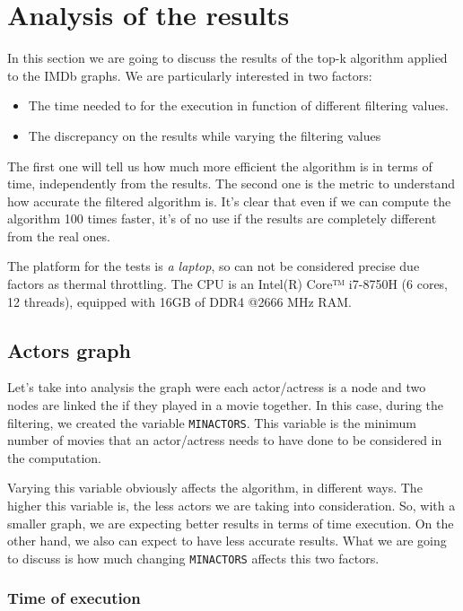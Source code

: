 \section{Analysis of the results}

In this section we are going to discuss the results of the top-k algorithm applied to the IMDb graphs. We are particularly interested in two factors:
\begin{itemize}
    \item The time needed to for the execution in function of different filtering values.
    \item The discrepancy on the results while varying the filtering values
\end{itemize}
The first one will tell us how much more efficient the algorithm is in terms of time, independently from the results. The second one is the metric to understand how accurate the filtered algorithm is. It's clear that even if we can compute the algorithm 100 times faster, it's of no use if the results are completely different from the real ones.\s

\nd The platform for the tests is \emph{a laptop}, so can not be considered precise due factors as thermal throttling. The CPU is an Intel(R) Core™ i7-8750H (6 cores, 12 threads), equipped with 16GB of DDR4 @2666 MHz RAM.

\subsection{Actors graph} \label{actors-graph}
Let's take into analysis the graph were each actor/actress is a node and two nodes are linked the if they played in a movie together. In this case, during the filtering, we created the variable \texttt{MIN\textunderscore ACTORS}. This variable is the minimum number of movies that an actor/actress needs to have done to be considered in the computation. \s

\nd Varying this variable obviously affects the algorithm, in different ways. The higher this variable is, the less actors we are taking into consideration. So, with a smaller graph, we are expecting better results in terms of time execution. On the other hand, we also can expect to have less accurate results. What we are going to discuss is how much changing \texttt{MIN\textunderscore ACTORS} affects this two factors.

\subsubsection{Time of execution} \label{time-actors}


